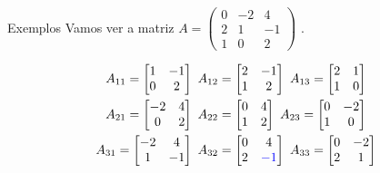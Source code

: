 \documentclass{beamer}
\begin{document}
\begin{frame}{Exemplos}
Vamos ver a matriz $ A =\begin{pmatrix} 0 & -2 & 4 \\ 2 & 1 & -1  \\1 & 0 & 2 \end{pmatrix} $ .

\begin{gather*}
A_{11} = \begin{bmatrix}
1 & -1 \\ 0 & 2
\end{bmatrix}\text{ }A_{12}=\begin{bmatrix}
2 & -1 \\ 1 & 2
\end{bmatrix}\text{ }A_{13}=\begin{bmatrix}
2 & 1 \\ 1 & 0
\end{bmatrix} \\
A_{21} = \begin{bmatrix}
-2 & 4 \\ 0 & 2
\end{bmatrix}\text{ }A_{22}=\begin{bmatrix}
0 & 4 \\ 1 & 2
\end{bmatrix}\text{ }A_{23}=\begin{bmatrix}
0 & -2 \\ 1 & 0
\end{bmatrix} \\
A_{31} = \begin{bmatrix}
-2 & 4 \\ 1 & -1
\end{bmatrix}\text{ }A_{32}=\begin{bmatrix}
0 & 4 \\ 2 & \textcolor{blue}{-1}
\end{bmatrix}\text{ }A_{33}=\begin{bmatrix}
0 & -2 \\ 2 & 1
\end{bmatrix}
\end{gather*}
\end{frame}
\end{document}
